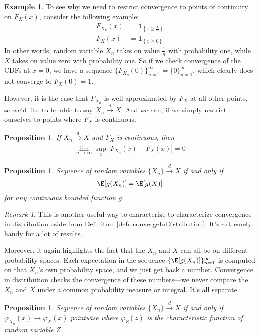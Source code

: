 \documentclass[12pt]{article}
\theoremstyle{plain}
\newtheorem{prop}[thm]{Proposition}
\theoremstyle{definition}
\newtheorem{ex}[thm]{Example}
\theoremstyle{remark}
\newtheorem*{rmk}{Remark}
\newcommand{\ra}{\rightarrow}
\newcommand{\one}[1]{\mathbf{1}_{#1}}
\newcommand{\dto}{\xrightarrow{d}}
\newcommand{\ninf}{_{n=1}^\infty}
\newcommand{\limn}{\lim_{n\rightarrow\infty}}
\begin{document}
\begin{ex}
To see why we need to restrict convergence to points of continuity on
$F_X(x)$, consider the following example:
\begin{align*}
  F_{X_n}(x) &= \one{\left\{x\geq \frac{1}{n}\right\}}\\
  F_{X}(x) &= \one{\left\{x\geq 0\right\}}
\end{align*} In other words, random variable $X_n$ takes on value
$\frac{1}{n}$ with probability one, while $X$ takes on value zero with
probability one.  So if we check convergence of the CDFs at $x=0$, we
have a sequence $\{F_{X_n}(0)\}_{n=1}^\infty=\{0\}_{n=1}^\infty$, which
clearly does not converge to $F_X(0)=1$.

However, it is the case that $F_{X_n}$ is well-approximated by $F_X$ at
all other points, so we'd like to be able to say $X_n\dto X$. And we
can, if we simply restrict ourselves to points where $F_X$ is
continuous.
\end{ex}

\begin{prop}
If $X_n\dto X$ and $F_X$ is continuous, then
\begin{align*}
  \limn \sup_x |F_{X_n}(x)-F_X(x)| = 0
\end{align*}
\end{prop}

\begin{prop}
Sequence of random variables $\{X_n\} \dto X$ if and only if
\begin{align*}
  \E[g(X_n)] = \E[g(X)]
\end{align*}
for any continuous bounded function $g$.
\end{prop}
\begin{rmk}
This is another useful way to characterize to characterize convergence
in distribution aside from Definiton~\ref{defn:convergeInDistribution}.
It's extremely handy for a lot of results.

Moreover, it again highlights the fact that the $X_n$ and $X$ can all be
on different probability spaces. Each expectation in the sequence
$\{\E[g(X_n)]\}\ninf$ is computed on that $X_n$'s own probability space,
and we just get back a number. Convergence in distribution checks the
convergence of these numbers---we never compare the $X_n$ and $X$ under
a common probability measure or integral. It's all separate.
\end{rmk}

\begin{prop}
Sequence of random variables $\{X_n\} \dto X$ if and only if
$\varphi_{X_n}(x) \ra \varphi_X(x)$ pointwise where $\varphi_Z(z)$ is
the characteristic function of random variable $Z$.
\end{prop}
\end{document}
